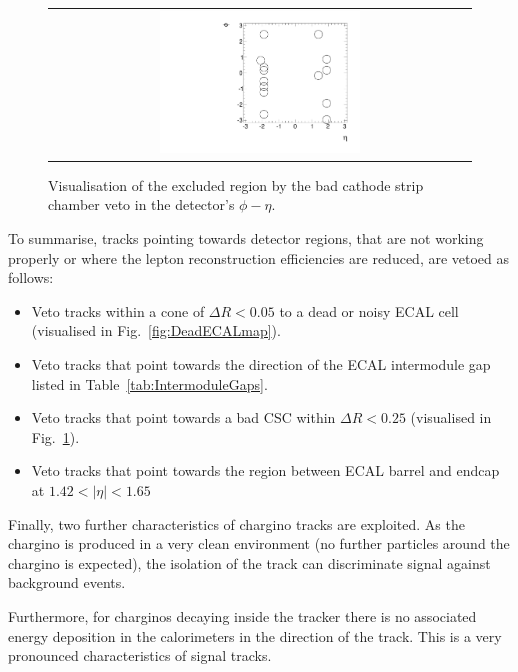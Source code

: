 \begin{figure}[!b]
  \centering 
  \begin{tabular}{c}
    \includegraphics[width=0.49\textwidth]{figures/analysis/AnalysisSelection/BadCSCMap2.pdf}
  \end{tabular}
  \caption{Visualisation of the excluded region by the bad cathode strip chamber veto in the detector's $\phi - \eta$.}
  \label{fig:BadCSCMap}
\end{figure}

To summarise, tracks pointing towards detector regions, that are not working properly or where the lepton reconstruction efficiencies are reduced, are vetoed as follows:
\begin{itemize}
\renewcommand{\labelitemi}{\footnotesize{\ding{118}}}
\item Veto tracks within a cone of $\Delta R<0.05$ to a dead or noisy ECAL cell (visualised in Fig.~\ref{fig:DeadECALmap}).
\item Veto tracks that point towards the direction of the ECAL intermodule gap listed in Table~\ref{tab:IntermoduleGaps}.
\item Veto tracks that point towards a bad CSC within $\Delta R<0.25$ (visualised in Fig.~\ref{fig:BadCSCMap}).
\item Veto tracks that point towards the region between ECAL barrel and endcap at $1.42<|\eta|<1.65$
\end{itemize}



Finally, two further characteristics of chargino tracks are exploited.
As the chargino is produced in a very clean environment (no further particles around the chargino is expected), the isolation of the track can discriminate signal against background events.

Furthermore, for charginos decaying inside the tracker there is no associated energy deposition in the calorimeters in the direction of the track.
This is a very pronounced characteristics of signal tracks.

